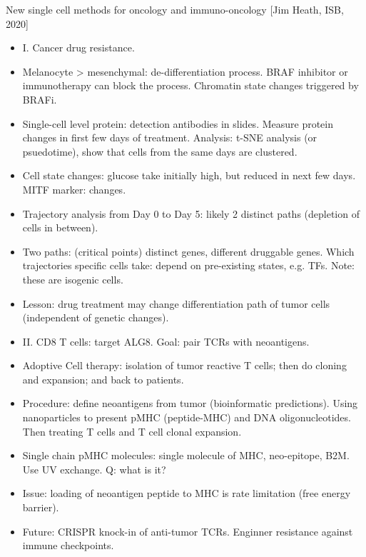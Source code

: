\documentclass{report}
\begin{document}
New single cell methods for oncology and immuno-oncology [Jim Heath, ISB, 2020]
\begin{itemize}
	\item I. Cancer drug resistance.
	
	\item Melanocyte > mesenchymal: de-differentiation process. BRAF inhibitor or immunotherapy can block the process. Chromatin state changes triggered by BRAFi.
	
	\item Single-cell level protein: detection antibodies in slides. Measure protein changes in first few days of treatment. Analysis: t-SNE analysis (or psuedotime), show that cells from the same days are clustered.
	
	\item Cell state changes: glucose take initially high, but reduced in next few days. MITF marker: changes.
	
	\item Trajectory analysis from Day 0 to Day 5: likely 2 distinct paths (depletion of cells in between).
	
	\item Two paths: (critical points) distinct genes, different druggable genes. Which trajectories specific cells take: depend on pre-existing states, e.g. TFs. Note: these are isogenic cells.
	
	\item Lesson: drug treatment may change differentiation path of tumor cells (independent of genetic changes).
	
	\item II. CD8 T cells: target ALG8. Goal: pair TCRs with neoantigens.
	
	\item Adoptive Cell therapy: isolation of tumor reactive T cells; then do cloning and expansion; and back to patients.
	
	\item Procedure: define neoantigens from tumor (bioinformatic predictions). Using nanoparticles to present pMHC (peptide-MHC) and DNA oligonucleotides. Then treating T cells and T cell clonal expansion.
	
	\item Single chain pMHC molecules: single molecule of MHC, neo-epitope, B2M.  Use UV exchange. Q: what is it?
	
	\item Issue: loading of neoantigen peptide to MHC is rate limitation (free energy barrier).
	
	\item Future: CRISPR knock-in of anti-tumor TCRs. Enginner resistance against immune checkpoints.
\end{itemize}

\end{document}
